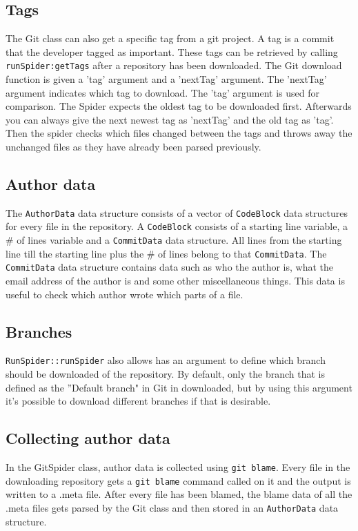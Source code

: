 \documentclass[../Main.tex]{subfiles}
\begin{document}
\subsection{Tags}
The Git class can also get a specific tag from a git project. A tag is a commit that the developer tagged as important. These tags can be retrieved by calling \texttt{runSpider:getTags} after a repository has been downloaded. The Git download function is given a 'tag' argument and a 'nextTag' argument. The 'nextTag' argument indicates which tag to download. The 'tag' argument is used for comparison. The Spider expects the oldest tag to be downloaded first. Afterwards you can always give the next newest tag as 'nextTag' and the old tag as 'tag'. Then the spider checks which files changed between the tags and throws away the unchanged files as they have already been parsed previously.
\subsection{Author data}
The \texttt{AuthorData} data structure consists of a vector of \texttt{CodeBlock} data structures for every file in the repository. A \texttt{CodeBlock} consists of a starting line variable, a \# of lines variable and a \texttt{CommitData} data structure. All lines from the starting line till the starting line plus the \# of lines belong to that \texttt{CommitData}. The \texttt{CommitData} data structure contains data such as who the author is, what the email address of the author is and some other miscellaneous things. This data is useful to check which author wrote which parts of a file.
\newpage
\subsection{Branches}
\texttt{RunSpider::runSpider} also allows has an argument to define which branch should be downloaded of the repository. By default, only the branch that is defined as the ''Default branch" in Git in downloaded, but by using this argument it's possible to download different branches if that is desirable.
\subsection{Collecting author data}
In the GitSpider class, author data is collected using \texttt{git blame}. Every file in the downloading repository gets a \texttt{git blame} command called on it and the output is written to a .meta file. After every file has been blamed, the blame data of all the .meta files gets parsed by the Git class and then stored in an \texttt{AuthorData} data structure.
\end{document}
